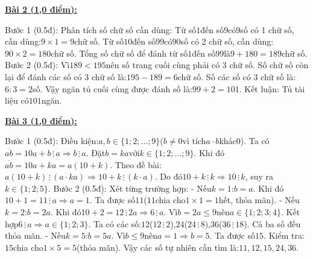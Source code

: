 \documentclass[11pt,a4paper]{article}
\begin{document}
\noindent\textbf{\underline{Bài 2 (1,0 điểm):}}\par\vspace{3pt}
Bước 1 (0.5đ): Phân tích số chữ số cần dùng: Từ số$1$đến số$9$có$9$số có 1 chữ số, cần dùng:$9 \times 1 = 9$chữ số. Từ số$10$đến số$99$có$90$số có 2 chữ số, cần dùng:$90 \times 2 = 180$chữ số. Tổng số chữ số để đánh từ số$1$đến số$99$là$9 + 180 = 189$chữ số. Bước 2 (0.5đ): Vì$189 < 195$nên số trang cuối cùng phải có 3 chữ số. Số chữ số còn lại để đánh các số có 3 chữ số là:$195 - 189 = 6$chữ số. Số các số có 3 chữ số là:$6 : 3 = 2$số. Vậy ngăn tủ cuối cùng được đánh số là:$99 + 2 = 101$. Kết luận: Tủ tài liệu có$101$ngăn.\par\vspace{8pt}

\noindent\textbf{\underline{Bài 3 (1,0 điểm):}}\par\vspace{3pt}
Bước 1 (0.5đ): Điều kiện:$a, b \in \{1; 2; \dots; 9\}$($b \ne 0$vì tích$a \cdot b$khác$0$). Ta có$\overline{ab} = 10a + b \,\vdots\, a \Rightarrow b \,\vdots\, a$. Đặt$b = ka$với$k \in \{1; 2; \dots; 9\}$. Khi đó$\overline{ab} = 10a + ka = a(10 + k)$. Theo đề bài:$a(10 + k) \,\vdots\, (a \cdot ka) \Rightarrow 10 + k \,\vdots\, (k \cdot a)$. Do đó$10 + k \,\vdots\, k \Rightarrow 10 \,\vdots\, k$, suy ra$k \in \{1; 2; 5\}$. Bước 2 (0.5đ): Xét từng trường hợp: - Nếu$k = 1$:$b = a$. Khi đó$10 + 1 = 11 \,\vdots\, a \Rightarrow a = 1$. Ta được số$11$($11$chia cho$1 \times 1 = 1$hết, thỏa mãn). - Nếu$k = 2$:$b = 2a$. Khi đó$10 + 2 = 12 \,\vdots\, 2a \Rightarrow 6 \,\vdots\, a$. Vì$b = 2a \le 9$nên$a \in \{1; 2; 3; 4\}$. Kết hợp$6 \,\vdots\, a \Rightarrow a \in \{1; 2; 3\}$. Ta có các số:$12$($12 \,\vdots\, 2$),$24$($24 \,\vdots\, 8$),$36$($36 \,\vdots\, 18$). Cả ba số đều thỏa mãn. - Nếu$k = 5$:$b = 5a$. Vì$b \le 9$nên$a = 1 \Rightarrow b = 5$. Ta được số$15$. Kiểm tra:$15$chia cho$1 \times 5 = 5$(thỏa mãn). Vậy các số tự nhiên cần tìm là:$11, 12, 15, 24, 36$.\par\vspace{8pt}
\end{document}
